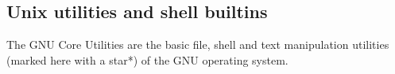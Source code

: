\documentclass[a4paper, 8pt]{extarticle}
\begin{document}
\renewcommand{\footrulewidth}{0.4pt}

\begin{multicols}{3}
\raggedright
\section{Unix utilities and shell builtins}
The GNU Core Utilities are the basic file, shell and text manipulation 
utilities (marked here with a star*) of the GNU operating system.













\end{multicols}
\end{document}
